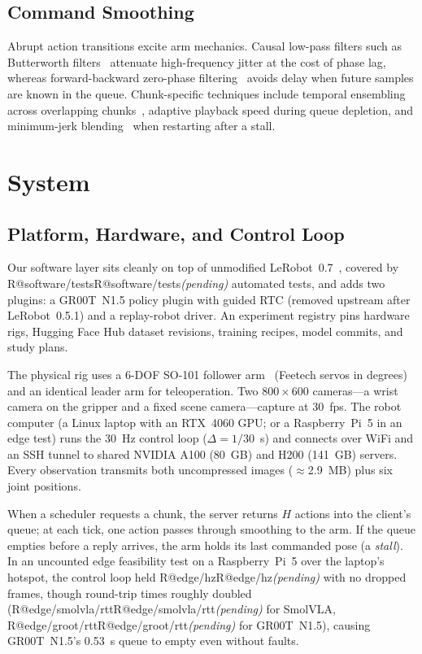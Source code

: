 \documentclass[conference]{IEEEtran}
\makeatletter
\newcommand{\R}[1]{\ifcsname R@#1\endcsname\csname R@#1\endcsname\else\textit{(pending)}\fi}
\newcommand{\smolvla}{SmolVLA}
\newcommand{\groot}{GR00T~N1.5}
\makeatother
\begin{document}
\subsection{Command Smoothing}

Abrupt action transitions excite arm mechanics. Causal low-pass filters such as Butterworth filters~\cite{butterworth1930} attenuate high-frequency jitter at the cost of phase lag, whereas forward-backward zero-phase filtering~\cite{gustafsson1996} avoids delay when future samples are known in the queue. Chunk-specific techniques include temporal ensembling across overlapping chunks~\cite{zhao2023act}, adaptive playback speed during queue depletion, and minimum-jerk blending~\cite{flash1985} when restarting after a stall.

\section{System}

\subsection{Platform, Hardware, and Control Loop}

Our software layer sits cleanly on top of unmodified LeRobot~0.7~\cite{lerobot}, covered by \R{software/tests} automated tests, and adds two plugins: a \groot{} policy plugin with guided RTC (removed upstream after LeRobot~0.5.1) and a replay-robot driver. An experiment registry pins hardware rigs, Hugging Face Hub dataset revisions, training recipes, model commits, and study plans.

The physical rig uses a 6-DOF SO-101 follower arm~\cite{so101} (Feetech servos in degrees) and an identical leader arm for teleoperation. Two $800\times 600$ cameras---a wrist camera on the gripper and a fixed scene camera---capture at 30~fps. The robot computer (a Linux laptop with an RTX~4060 GPU; or a Raspberry~Pi~5 in an edge test) runs the 30~Hz control loop ($\Delta = 1/30$~s) and connects over WiFi and an SSH tunnel to shared NVIDIA A100 (80~GB) and H200 (141~GB) servers. Every observation transmits both uncompressed images ($\approx$2.9~MB) plus six joint positions.

When a scheduler requests a chunk, the server returns $H$ actions into the client's queue; at each tick, one action passes through smoothing to the arm. If the queue empties before a reply arrives, the arm holds its last commanded pose (a \emph{stall}). In an uncounted edge feasibility test on a Raspberry~Pi~5 over the laptop's hotspot, the control loop held \R{edge/hz} with no dropped frames, though round-trip times roughly doubled (\R{edge/smolvla/rtt} for \smolvla{}, \R{edge/groot/rtt} for \groot{}), causing \groot's 0.53~s queue to empty even without faults.
\end{document}
